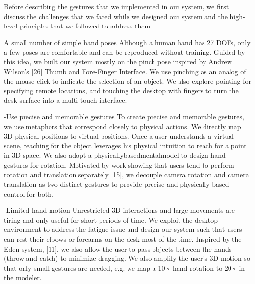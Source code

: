 Before describing the gestures that we implemented in our
system, we first discuss the challenges that we faced while
we designed our system and the high-level principles that we
followed to address them.

A small number of simple hand poses Although a human hand has 27 DOFs, only a few poses are comfortable and can be reproduced without training. Guided by this idea, we built our system mostly on the pinch pose inspired by Andrew Wilson’s [26] Thumb and Fore-Finger Interface. We use pinching as an analog of the mouse click to indicate the selection of an object. We also explore pointing for specifying remote locations, and touching the desktop with fingers to turn the desk surface into a multi-touch interface. 

-Use precise and memorable gestures 
To create precise and memorable gestures, we use metaphors that correspond closely to physical actions. We directly map 3D physical positions to virtual positions. Once a user understands a virtual scene, reaching for the object leverages his physical intuition to reach for a point in 3D space. We also adopt a physicallybasedmentalmodel to design hand gestures for rotation. Motivated by work showing that users tend to perform rotation and translation separately [15], we decouple camera rotation and camera translation as two distinct gestures to provide precise and physically-based control for both. 

-Limited hand motion 
Unrestricted 3D interactions and large movements are tiring and only useful for short periods of time. We exploit the desktop environment to address the fatigue issue and design our system such that users can rest their elbows or forearms on the desk most of the time. Inspired by the Eden system, [11], we also allow the user to pass objects between the hands (throw-and-catch) to minimize dragging. We also amplify the user’s 3D motion so that only small gestures are needed, e.g. we map a 10◦ hand rotation to 20◦ in the modeler.



